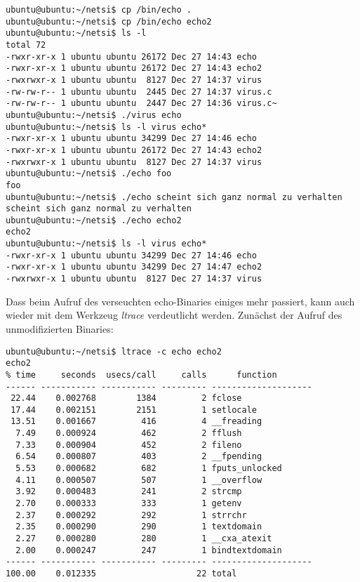 \documentclass[a4paper,11pt,parskip=half]{scrartcl}
\begin{document}
\begin{lstlisting}
ubuntu@ubuntu:~/netsi$ cp /bin/echo .
ubuntu@ubuntu:~/netsi$ cp /bin/echo echo2
ubuntu@ubuntu:~/netsi$ ls -l
total 72
-rwxr-xr-x 1 ubuntu ubuntu 26172 Dec 27 14:43 echo
-rwxr-xr-x 1 ubuntu ubuntu 26172 Dec 27 14:43 echo2
-rwxrwxr-x 1 ubuntu ubuntu  8127 Dec 27 14:37 virus
-rw-rw-r-- 1 ubuntu ubuntu  2445 Dec 27 14:37 virus.c
-rw-rw-r-- 1 ubuntu ubuntu  2447 Dec 27 14:36 virus.c~
ubuntu@ubuntu:~/netsi$ ./virus echo
ubuntu@ubuntu:~/netsi$ ls -l virus echo*
-rwxr-xr-x 1 ubuntu ubuntu 34299 Dec 27 14:46 echo
-rwxr-xr-x 1 ubuntu ubuntu 26172 Dec 27 14:43 echo2
-rwxrwxr-x 1 ubuntu ubuntu  8127 Dec 27 14:37 virus
ubuntu@ubuntu:~/netsi$ ./echo foo
foo
ubuntu@ubuntu:~/netsi$ ./echo scheint sich ganz normal zu verhalten
scheint sich ganz normal zu verhalten
ubuntu@ubuntu:~/netsi$ ./echo echo2
echo2
ubuntu@ubuntu:~/netsi$ ls -l virus echo*
-rwxr-xr-x 1 ubuntu ubuntu 34299 Dec 27 14:46 echo
-rwxr-xr-x 1 ubuntu ubuntu 34299 Dec 27 14:47 echo2
-rwxrwxr-x 1 ubuntu ubuntu  8127 Dec 27 14:37 virus
\end{lstlisting}

Dass beim Aufruf des verseuchten echo-Binaries einiges mehr passiert, kann auch wieder mit dem Werkzeug \emph{ltrace} verdeutlicht werden. Zunächst der Aufruf des unmodifizierten Binaries:
\begin{lstlisting}
ubuntu@ubuntu:~/netsi$ ltrace -c echo echo2
echo2
% time     seconds  usecs/call     calls      function
------ ----------- ----------- --------- --------------------
 22.44    0.002768        1384         2 fclose
 17.44    0.002151        2151         1 setlocale
 13.51    0.001667         416         4 __freading
  7.49    0.000924         462         2 fflush
  7.33    0.000904         452         2 fileno
  6.54    0.000807         403         2 __fpending
  5.53    0.000682         682         1 fputs_unlocked
  4.11    0.000507         507         1 __overflow
  3.92    0.000483         241         2 strcmp
  2.70    0.000333         333         1 getenv
  2.37    0.000292         292         1 strrchr
  2.35    0.000290         290         1 textdomain
  2.27    0.000280         280         1 __cxa_atexit
  2.00    0.000247         247         1 bindtextdomain
------ ----------- ----------- --------- --------------------
100.00    0.012335                    22 total
\end{lstlisting}
\end{document}
